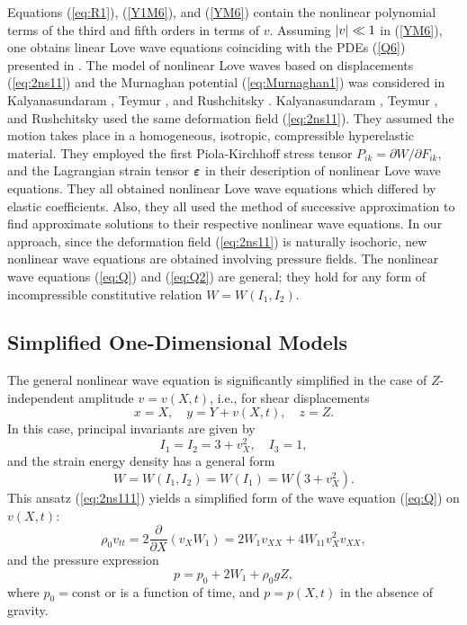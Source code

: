 \documentclass[11pt,letter,subeqn,fleqn]{article}
\DeclarePairedDelimiter{\abs}{\lvert}{\rvert}
\numberwithin{equation}{section}
\numberwithin{table}{section}
\numberwithin{figure}{section}
\def\vec#1{{\boldsymbol{\rm #1}}} %
\def\vec#1{{\boldsymbol{\rm #1}}} %
\begin{document}
\medskip
Equations (\ref{eq:R1}), (\ref{Y1M6}), and (\ref{YM6}) contain the nonlinear polynomial terms of the third and fifth orders in terms of $v$.  Assuming $\abs{v}\ll1$ in  (\ref{YM6}), one obtains linear Love wave equations coinciding with the PDEs (\ref{Q6}) presented in \cite{achenbach2012wave,love2015some,rushchitsky2014nonlinear}.
The model of nonlinear Love waves based on displacements (\ref{eq:2ns11}) and the Murnaghan potential (\ref{eq:Murnaghan1}) was considered in Kalyanasundaram \cite{kalyansaundaram1981finite}, Teymur \cite{teymur1988nonlinear}, and Rushchitsky \cite{rushchitsky2013nonlinear,rushchitsky2014nonlinear}. Kalyanasundaram \cite{kalyansaundaram1981finite}, Teymur \cite{teymur1988nonlinear}, and Rushchitsky \cite{rushchitsky2013nonlinear,rushchitsky2014nonlinear} used the same deformation field (\ref{eq:2ns11}). They assumed the motion takes place in a homogeneous, isotropic, compressible hyperelastic material. They employed the first Piola-Kirchhoff stress tensor $\displaystyle P_{ik}=\partial W/\partial F_{ik}$, and the Lagrangian strain tensor $\vec{\varepsilon}$ in their description of nonlinear Love wave equations. They all obtained nonlinear Love wave equations which differed by elastic coefficients. Also, they all used the method of successive approximation to find approximate solutions to their respective nonlinear wave equations. In our approach, since the deformation field (\ref{eq:2ns11}) is naturally isochoric, new nonlinear wave equations are obtained involving pressure fields. The nonlinear wave equations (\ref{eq:Q}) and (\ref{eq:Q2}) are general; they hold for any form of incompressible constitutive relation $W=W(I_{1},I_{2})$.

\subsection{Simplified One-Dimensional Models}\label{1d}
The general nonlinear wave equation is significantly simplified in the case of $Z$-independent amplitude $v=v(X,t)$, i.e., for shear displacements
\begin{equation}\label{eq:2ns111}
x={X},\quad
y=Y+ {v}({X},t),\quad z={Z}.
\end{equation}
In this case, principal invariants are given by
\begin{equation}\label{eq:20e}
I_1=I_{2}=3+v^{2}_X,\quad I_3=1,
\end{equation}
 and the strain energy density has a general form
\begin{equation}\label{eq:20ff}
\displaystyle W=W(I_1,I_2)=W(I_{1})=W(3+v^{2}_{X}).
\end{equation}
This ansatz (\ref{eq:2ns111}) yields a simplified form of the wave equation (\ref{eq:Q}) on $v(X,t)$:
\begin{equation}\label{eq:A1}
\rho_{0}v_{tt}=2\frac{\partial }{\partial X}\left(v_{X}W_{1}\right)=2W_{1}v_{XX}+4W_{11}v^{2}_{X}v_{XX},
\end{equation}
and the pressure expression
\begin{equation}\label{eq:A2}
p=p_{0}+2W_{1}+\rho_{0}gZ,
\end{equation}
where $p_{0}=\mathrm{const}$ or is a function of time, and $p=p(X,t)$ in the absence of gravity.
\end{document}
